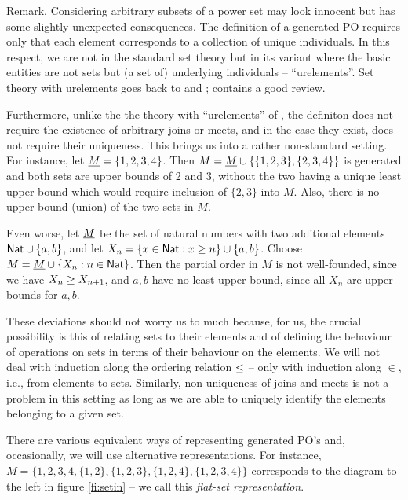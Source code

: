 \begin{REMARK}{Remark.}
Considering arbitrary subsets of a power set may look innocent but has
some slightly unexpected consequences.  The definition of a generated
PO requires only that each element corresponds to a collection of
unique individuals. In this respect, we are not in the standard set
theory but in its variant where the basic entities are not sets but (a
set of) underlying individuals -- ``urelements''. Set theory with
urelements goes back to \cite{K} and \cite{P}; \cite{KP} contains a
good review. 

Furthermore, unlike the the theory with ``urelements'' of \cite{KP},
the definiton does not require the existence of arbitrary joins or
meets, and in the case they exist, does not require their
uniqueness. This brings us into a rather non-standard setting.  For
instance, let $\underline {M}=\{1,2,3,4\}$. Then $M=\underline {M}\cup
\{\{1,2,3\},\{2,3,4\}\}$ is generated and both sets are upper bounds
of 2 and 3, without the two having a unique least upper bound which
would require inclusion of $\{2,3\}$ into $M$. Also, there is no upper
bound (union) of the two sets in $M$.

Even worse, let $\underline {M}$
be the set of natural numbers with two additional elements ${\sf Nat}\cup
\{a,b\}$, and let $X_n=\{x\in{\sf Nat} :x\geq n\}\cup\{a,b\}$. 
Choose $M=\underline {M}\cup \{X_n:n\in{\sf Nat}\}$. Then the partial order in
$M$ is not well-founded, since we have $X_n\geq X_{n+1}$, and $a,b$
have no least upper bound, since all $X_n$ are upper bounds for $a,b$.

These deviations should not worry us to much because, for us,
the crucial possibility is this of relating sets to their
elements and of defining the behaviour of operations on sets in terms
of their behaviour on the elements. We will not deal with induction
along the ordering relation $\leq$ -- only with induction along $\in$,
i.e., from elements to sets. Similarly, non-uniqueness of joins and
meets is not a problem in this setting as long as we are able to
uniquely identify the elements belonging to a given set.
\end{REMARK}
There are various equivalent ways of representing generated PO's and,
occasionally, we will use alternative representations. For instance,
$M=\{1,2,3,4,\{1,2\},\{1,2,3\},\{1,2,4\},\{1,2,3,4\}\}$ corresponds to
the diagram to the left in figure \ref{fi:setin} -- we call this {\em flat-set representation}.
